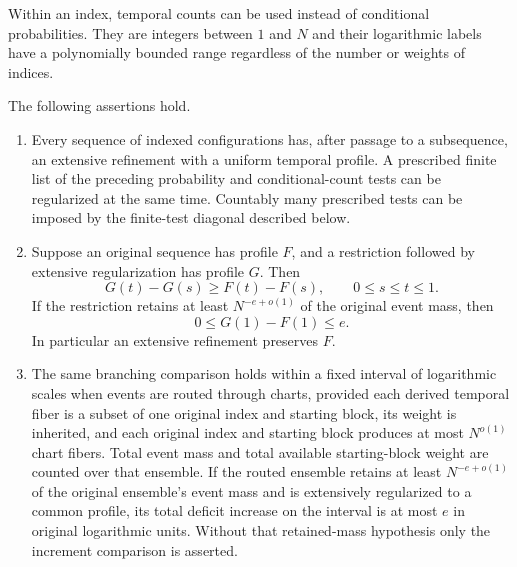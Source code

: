 Within an index, temporal counts can be used instead of conditional
probabilities.  They are integers between $1$ and $N$ and their logarithmic
labels have a polynomially bounded range regardless of the number or
weights of indices.

\begin{lemma}
\label{lem:regularization}
The following assertions hold.
\begin{enumerate}[label=(\roman*)]
\item Every sequence of indexed configurations has, after passage to a
subsequence, an extensive refinement with a uniform temporal profile.  A
prescribed finite list of the preceding probability and conditional-count
tests can be regularized at the same time.  Countably many prescribed tests
can be imposed by the finite-test diagonal described below.
\item Suppose an original sequence has profile $F$, and a restriction
followed by extensive regularization has profile $G$.  Then
\begin{equation}\label{eq:branching-domination}
 G(t)-G(s)\ge F(t)-F(s),\qquad 0\le s\le t\le1.
\end{equation}
If the restriction retains at least $N^{-e+o(1)}$ of the original event
mass, then
\begin{equation}\label{eq:total-deficit-loss}
 0\le G(1)-F(1)\le e.
\end{equation}
In particular an extensive refinement preserves $F$.
\item The same branching comparison holds within a fixed interval of
logarithmic scales when events are routed through charts, provided each
derived temporal fiber is a subset of one original index and starting
block, its weight is inherited, and each original index and starting block
produces at most $N^{o(1)}$ chart fibers.  Total event mass and total
available starting-block weight are counted over that ensemble.  If the
routed ensemble retains at least $N^{-e+o(1)}$ of the original ensemble's
event mass and is extensively regularized to a common profile, its total
deficit increase on the interval is at most $e$ in original logarithmic
units.  Without that retained-mass hypothesis only the increment comparison
is asserted.
\end{enumerate}
\end{lemma}

